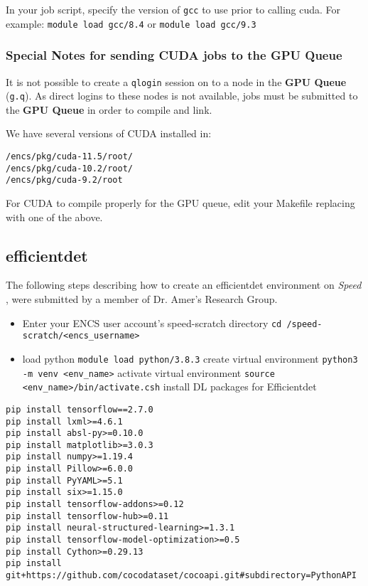 \documentclass{easychair}
\begin{document}
In your job script, specify the version of \texttt{gcc} to use prior to calling 
cuda. For example: 
   \texttt{module load gcc/8.4}
or
   \texttt{module load gcc/9.3}

\subsubsection{Special Notes for sending CUDA jobs to the GPU Queue}

It is not possible to create a \texttt{qlogin} session on to a node in the 
\textbf{GPU Queue} (\texttt{g.q}). As direct logins to these nodes is not 
available, jobs must be submitted to the \textbf{GPU Queue} in order to compile 
and link.

We have several versions of CUDA installed in:
\begin{verbatim}
/encs/pkg/cuda-11.5/root/
/encs/pkg/cuda-10.2/root/
/encs/pkg/cuda-9.2/root
\end{verbatim}

For CUDA to compile properly for the GPU queue, edit your Makefile 
replacing  with one of the above.

\subsection{efficientdet}

The following steps describing how to create an efficientdet environment on \emph{Speed}
, were submitted by a member of Dr. Amer's Research Group.

\begin{itemize}
    \item 
    Enter your ENCS user account's speed-scratch directory 
    \verb!cd /speed-scratch/<encs_username>!
    \item
    load python \verb!module load python/3.8.3!
    create virtual environment \verb!python3 -m venv <env_name>!
    activate virtual environment \verb!source <env_name>/bin/activate.csh!
    install DL packages for Efficientdet
\end{itemize}
\begin{verbatim}
pip install tensorflow==2.7.0
pip install lxml>=4.6.1
pip install absl-py>=0.10.0
pip install matplotlib>=3.0.3
pip install numpy>=1.19.4
pip install Pillow>=6.0.0
pip install PyYAML>=5.1
pip install six>=1.15.0
pip install tensorflow-addons>=0.12
pip install tensorflow-hub>=0.11
pip install neural-structured-learning>=1.3.1
pip install tensorflow-model-optimization>=0.5
pip install Cython>=0.29.13
pip install git+https://github.com/cocodataset/cocoapi.git#subdirectory=PythonAPI
\end{verbatim}
\end{document}
